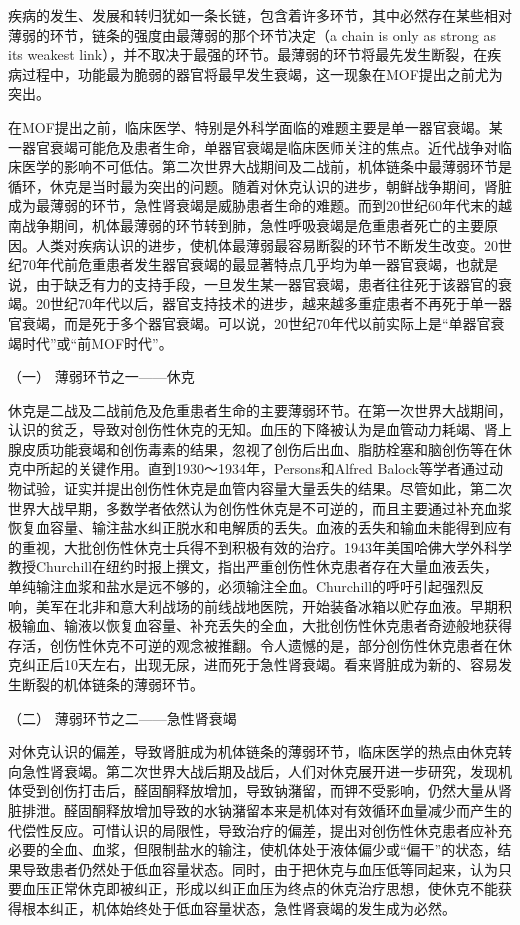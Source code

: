 疾病的发生、发展和转归犹如一条长链，包含着许多环节，其中必然存在某些相对薄弱的环节，链条的强度由最薄弱的那个环节决定（a
chain is only as strong as its weakest
link），并不取决于最强的环节。最薄弱的环节将最先发生断裂，在疾病过程中，功能最为脆弱的器官将最早发生衰竭，这一现象在MOF提出之前尤为突出。

在MOF提出之前，临床医学、特别是外科学面临的难题主要是单一器官衰竭。某一器官衰竭可能危及患者生命，单器官衰竭是临床医师关注的焦点。近代战争对临床医学的影响不可低估。第二次世界大战期间及二战前，机体链条中最薄弱环节是循环，休克是当时最为突出的问题。随着对休克认识的进步，朝鲜战争期间，肾脏成为最薄弱的环节，急性肾衰竭是威胁患者生命的难题。而到20世纪60年代末的越南战争期间，机体最薄弱的环节转到肺，急性呼吸衰竭是危重患者死亡的主要原因。人类对疾病认识的进步，使机体最薄弱最容易断裂的环节不断发生改变。20世纪70年代前危重患者发生器官衰竭的最显著特点几乎均为单一器官衰竭，也就是说，由于缺乏有力的支持手段，一旦发生某一器官衰竭，患者往往死于该器官的衰竭。20世纪70年代以后，器官支持技术的进步，越来越多重症患者不再死于单一器官衰竭，而是死于多个器官衰竭。可以说，20世纪70年代以前实际上是“单器官衰竭时代”或“前MOF时代”。

\hypertarget{text00092.htmlux5cux23CHP3-11-1-1-1}{}
（一） 薄弱环节之一------休克

休克是二战及二战前危及危重患者生命的主要薄弱环节。在第一次世界大战期间，认识的贫乏，导致对创伤性休克的无知。血压的下降被认为是血管动力耗竭、肾上腺皮质功能衰竭和创伤毒素的结果，忽视了创伤后出血、脂肪栓塞和脑创伤等在休克中所起的关键作用。直到1930～1934年，Persons和Alfred
Balock等学者通过动物试验，证实并提出创伤性休克是血管内容量大量丢失的结果。尽管如此，第二次世界大战早期，多数学者依然认为创伤性休克是不可逆的，而且主要通过补充血浆恢复血容量、输注盐水纠正脱水和电解质的丢失。血液的丢失和输血未能得到应有的重视，大批创伤性休克士兵得不到积极有效的治疗。1943年美国哈佛大学外科学教授Churchill在纽约时报上撰文，指出严重创伤性休克患者存在大量血液丢失，单纯输注血浆和盐水是远不够的，必须输注全血。Churchill的呼吁引起强烈反响，美军在北非和意大利战场的前线战地医院，开始装备冰箱以贮存血液。早期积极输血、输液以恢复血容量、补充丢失的全血，大批创伤性休克患者奇迹般地获得存活，创伤性休克不可逆的观念被推翻。令人遗憾的是，部分创伤性休克患者在休克纠正后10天左右，出现无尿，进而死于急性肾衰竭。看来肾脏成为新的、容易发生断裂的机体链条的薄弱环节。

\hypertarget{text00092.htmlux5cux23CHP3-11-1-1-2}{}
（二） 薄弱环节之二------急性肾衰竭

对休克认识的偏差，导致肾脏成为机体链条的薄弱环节，临床医学的热点由休克转向急性肾衰竭。第二次世界大战后期及战后，人们对休克展开进一步研究，发现机体受到创伤打击后，醛固酮释放增加，导致钠潴留，而钾不受影响，仍然大量从肾脏排泄。醛固酮释放增加导致的水钠潴留本来是机体对有效循环血量减少而产生的代偿性反应。可惜认识的局限性，导致治疗的偏差，提出对创伤性休克患者应补充必要的全血、血浆，但限制盐水的输注，使机体处于液体偏少或“偏干”的状态，结果导致患者仍然处于低血容量状态。同时，由于把休克与血压低等同起来，认为只要血压正常休克即被纠正，形成以纠正血压为终点的休克治疗思想，使休克不能获得根本纠正，机体始终处于低血容量状态，急性肾衰竭的发生成为必然。

